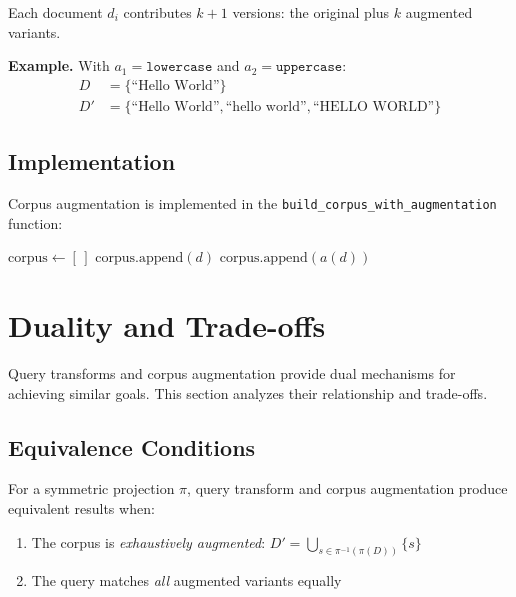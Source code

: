 \documentclass[11pt]{article}
\begin{document}
Each document $d_i$ contributes $k+1$ versions: the original plus $k$ augmented variants.

\textbf{Example.} With $a_1 = \texttt{lowercase}$ and $a_2 = \texttt{uppercase}$:
\begin{align*}
D &= \{\text{``Hello World''}\} \\
D' &= \{\text{``Hello World''}, \text{``hello world''}, \text{``HELLO WORLD''}\}
\end{align*}

\subsection{Implementation}

Corpus augmentation is implemented in the \texttt{build\_corpus\_with\_augmentation} function:

\begin{algorithmic}[1]
    \State $\text{corpus} \gets [\,]$
        \State $\text{corpus}.\text{append}(d)$
            \State $\text{corpus}.\text{append}(a(d))$
        \EndFor
    \EndFor
    \State \Return {}
\EndFunction
\end{algorithmic}

\section{Duality and Trade-offs}

Query transforms and corpus augmentation provide dual mechanisms for achieving similar goals. This section analyzes their relationship and trade-offs.

\subsection{Equivalence Conditions}

For a symmetric projection $\pi$, query transform and corpus augmentation produce equivalent results when:
\begin{enumerate}
    \item The corpus is \emph{exhaustively augmented}: $D' = \bigcup_{s \in \pi^{-1}(\pi(D))} \{s\}$
    \item The query matches \emph{all} augmented variants equally
\end{enumerate}
\end{document}
